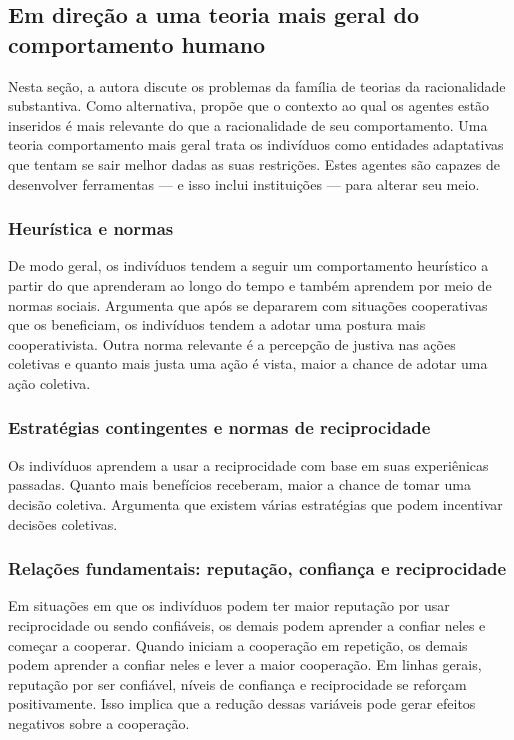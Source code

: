 \documentclass[11pt]{article}
\begin{document}
\subsection{Em direção a uma teoria mais geral do comportamento humano}
\label{sec:orgc3bb45e}

Nesta seção, a autora discute os problemas da família de teorias da racionalidade substantiva.
Como alternativa, propõe que o contexto ao qual os agentes estão inseridos é mais relevante do que a racionalidade de seu comportamento.
Uma teoria comportamento mais geral trata os indivíduos como entidades adaptativas que tentam se sair melhor dadas as suas restrições.
Estes agentes são capazes de desenvolver ferramentas --- e isso inclui instituições --- para alterar seu meio.

\subsubsection{Heurística e normas}
\label{sec:org4cd3246}

De modo geral, os indivíduos tendem a seguir um comportamento heurístico a partir do que aprenderam ao longo do tempo e também aprendem por meio de normas sociais.
Argumenta que após se depararem com situações cooperativas que os beneficiam, os indivíduos tendem a adotar uma postura mais cooperativista.
Outra norma relevante é a percepção de justiva nas ações coletivas e quanto mais justa uma ação é vista, maior a chance de adotar uma ação coletiva.

\subsubsection{Estratégias contingentes e normas de reciprocidade}
\label{sec:orged76489}

Os indivíduos aprendem a usar a reciprocidade com base em suas experiênicas passadas.
Quanto mais benefícios receberam, maior a chance de tomar uma decisão coletiva.
Argumenta que existem várias estratégias que podem incentivar decisões coletivas.

\subsubsection{Relações fundamentais: reputação, confiança e reciprocidade}
\label{sec:org2128045}

Em situações em que os indivíduos podem ter maior reputação por usar reciprocidade ou sendo confiáveis, os demais podem aprender a confiar neles e começar a cooperar.
Quando iniciam a cooperação em repetição, os demais podem aprender a confiar neles e lever a maior cooperação.
Em linhas gerais, reputação por ser confiável, níveis de confiança e reciprocidade se reforçam positivamente.
Isso implica que a redução dessas variáveis pode gerar efeitos negativos sobre a cooperação.
\end{document}
